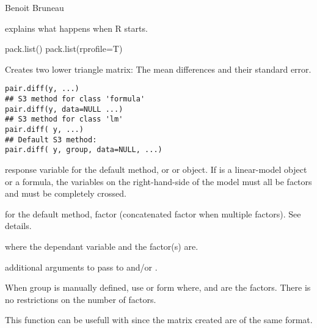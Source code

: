 \documentclass[a4paper]{book}
\begin{document}
%
\begin{Author}\relax
Benoit Bruneau
\end{Author}
%
\begin{SeeAlso}\relax
{} explains what happens when R starts.
\end{SeeAlso}
%
\begin{Examples}
\begin{ExampleCode}
pack.list()
pack.list(rprofile=T)

\end{ExampleCode}
\end{Examples}
\newpage
{}
%
\begin{Description}\relax
Creates two lower triangle matrix: The mean differences and their standard error.
\end{Description}
%
\begin{Usage}
\begin{verbatim}
pair.diff(y, ...)
## S3 method for class 'formula'
pair.diff(y, data=NULL ...)
## S3 method for class 'lm'
pair.diff( y, ...)
## Default S3 method:
pair.diff( y, group, data=NULL, ...)
\end{verbatim}
\end{Usage}
%
\begin{Arguments}
\begin{ldescription}
\item[\code{y}] response variable for the default method, or  or
 object. If  is a linear-model object or a formula,
the variables on the right-hand-side of the model must all be factors and
must be completely crossed.
\item[\code{group}] for the default method, factor (concatenated factor when multiple factors). See details.
\item[\code{data}]  where the dependant variable and the factor(s) are.
\item[\code{...}]  additional arguments to pass to  and/or . 
\end{ldescription}
\end{Arguments}
%
\begin{Details}\relax
When group is manually defined, use  or form where,  and  are the factors. There is no restrictions on the number of factors.

This function can be usefull with  since the matrix created are of the same format.
\end{Details}
\end{document}
